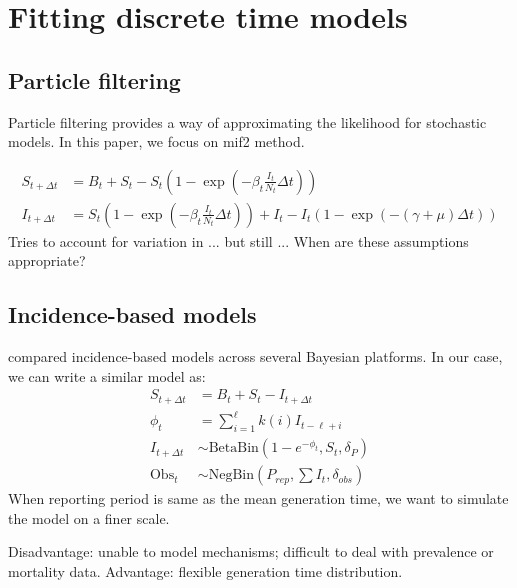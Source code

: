\documentclass{article}
\begin{document}
\section{Fitting discrete time models}

\subsection{Particle filtering}

Particle filtering provides a way of approximating the likelihood for stochastic models.
In this paper, we focus on mif2 method.

\begin{equation}
\begin{aligned}
S_{t + \Delta t} &= B_t + S_t - S_t \left(1- \exp\left(-\beta_t \frac{I_t}{N_t} \Delta t\right)\right)\\
I_{t + \Delta t} &= S_t \left( 1- \exp\left(-\beta_t \frac{I_t}{N_t} \Delta t\right)\right) + I_t - I_t (1 - \exp(-(\gamma + \mu) \Delta t))
\end{aligned}
\end{equation}
Tries to account for variation in ... but still ... When are these assumptions appropriate?

\subsection{Incidence-based models}

\cite{li2018fitting} compared incidence-based models across several Bayesian platforms.
In our case, we can write a similar model as:
\begin{equation}
\begin{aligned}
S_{t + \Delta t} &= B_t + S_t - I_{t+\Delta t}\\
\phi_t &= \sum_{i=1}^\ell k(i) I_{t - \ell +i}\\
I_{t + \Delta t} &\sim \mathrm{BetaBin}(1- e^{-\phi_t}, S_t,\delta_P)\\
\mathrm{Obs}_t &\sim \mathrm{NegBin}(P_{rep}, \sum I_t, \delta_{obs})
\end{aligned}
\end{equation}
When reporting period is same as the mean generation time, we want to simulate the model on a finer scale.

Disadvantage: unable to model mechanisms; difficult to deal with prevalence or mortality data.
Advantage: flexible generation time distribution.
\end{document}
